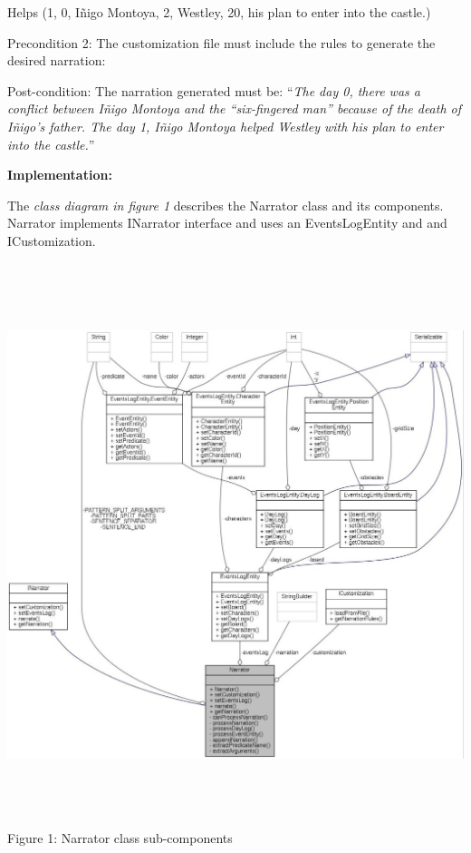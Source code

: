 \documentclass[a4paper]{article}
\newcommand\textstyleStrongEmphasis[1]{\textbf{#1}}
\newcommand\textstyleEmphasis[1]{\textit{#1}}
\begin{document}
{\ttfamily
Helps (1, 0, {\textquotesingle}I\~nigo Montoya{\textquotesingle}, 2,
{\textquotesingle}Westley{\textquotesingle},
{\textquotesingle}20{\textquotesingle}, {\textquotesingle}his plan to
enter into the castle.{\textquotesingle})}

Precondition 2: The customization file must include the rules to
generate the desired narration:

Post-condition: The narration generated must be:
{\textquotedblleft}\textstyleEmphasis{The day 0, there was a conflict
between I\~nigo Montoya and the {\textquotedblleft}six-fingered
man{\textquotedblright} because of the death of
I\~nigo{\textquoteright}s father. The day 1, I\~nigo Montoya helped
Westley with his plan to enter into the castle.}{\textquotedblright}

\textstyleStrongEmphasis{Implementation:}

The \textstyleEmphasis{class diagram in figure 1} describes the Narrator
class and its components. Narrator implements INarrator interface and
uses an EventsLogEntity and and ICustomization.

{\centering
\href{http://www.velonuboso.com/made/blog/wp-content/uploads/2015/07/classcom_1_1velonuboso_1_1made_1_1core_1_1narration_1_1implementation_1_1_narrator__coll__graph.jpg}{
\includegraphics[width=17.515cm,height=16.404cm]{makingofmade113-img11.jpg}
}Figure 1: Narrator class sub-components
\par}
\end{document}
